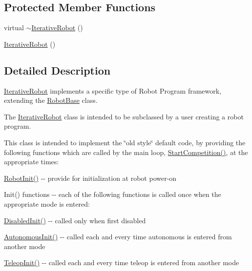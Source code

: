 \subsection*{\-Protected \-Member \-Functions}
\begin{DoxyCompactItemize}
\item 
virtual \hyperlink{classIterativeRobot_a0d80a18c34ba474248a806ed0ea5ad74}{$\sim$\-Iterative\-Robot} ()
\item 
\hyperlink{classIterativeRobot_a7ec0b439b50ba3bc7ca34a6ed1653304}{\-Iterative\-Robot} ()
\end{DoxyCompactItemize}


\subsection{\-Detailed \-Description}
\hyperlink{classIterativeRobot}{\-Iterative\-Robot} implements a specific type of \-Robot \-Program framework, extending the \hyperlink{classRobotBase}{\-Robot\-Base} class.

\-The \hyperlink{classIterativeRobot}{\-Iterative\-Robot} class is intended to be subclassed by a user creating a robot program.

\-This class is intended to implement the \char`\"{}old style\char`\"{} default code, by providing the following functions which are called by the main loop, \hyperlink{classIterativeRobot_ab0af04a781b0390981b9f0dd75358515}{\-Start\-Competition()}, at the appropriate times\-:

\hyperlink{classIterativeRobot_a5296334b4a48ad2123c29f49209b9f62}{\-Robot\-Init()} -\/-\/ provide for initialization at robot power-\/on

\-Init() functions -\/-\/ each of the following functions is called once when the appropriate mode is entered\-:
\begin{DoxyItemize}
\item \hyperlink{classIterativeRobot_a428a5875274cb886730530d633a50db9}{\-Disabled\-Init()} -\/-\/ called only when first disabled
\item \hyperlink{classIterativeRobot_aa936c0a4526e12e32defd50609cca90c}{\-Autonomous\-Init()} -\/-\/ called each and every time autonomous is entered from another mode
\item \hyperlink{classIterativeRobot_a7365e781f0a04674b94bb1fb5767d83e}{\-Teleop\-Init()} -\/-\/ called each and every time teleop is entered from another mode
\end{DoxyItemize}


